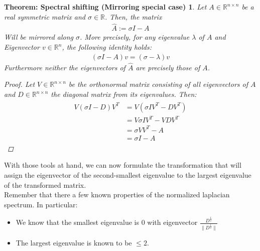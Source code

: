 \documentclass[10pt, a4paper, twocolumn]{article} %
\begin{document}
    \newtheorem{shifting}[]{Theorem: Spectral shifting (Mirroring special case)}[section]
    \begin{shifting}
        Let $A \in \mathbb{R}^{n \times n}$ be a real symmetric matrix and $\sigma \in \mathbb{R}$.
        Then, the matrix
        \begin{align}
            \hat{A} := \sigma I - A
        \end{align}
        Will be mirrored along $\sigma$. More precisely, for any eigenvalue $\lambda$ of $A$ and Eigenvector
        $v \in \mathbb{R}^n$, the following identity holds:
        \begin{align}
            \left( \sigma I -A \right) v = \left( \sigma - \lambda \right) v
        \end{align}
        Furthermore neither the eigenvectors of $\hat{A}$ are precisely those of $A$.
        \begin{proof}[Proof]
            Let $V \in \mathbb{R}^{n \times n}$ be the orthonormal matrix consisting of all eigenvectors of $A$
            and $D \in \mathbb{R}^{n \times n}$ the diagonal matrix from its eigenvalues. Then:
            \begin{align}
                \begin{split}
                    V \left( \sigma I - D \right) V^T & = V \left( \sigma I V^T - D V ^T \right) \\
                    & = V \sigma I V^T - VDV^T \\
                    & = \sigma V V^T - A \\
                    & = \sigma I -A
                \end{split}
            \end{align}
        \end{proof}
    \end{shifting}

    With those tools at hand, we can now formulate the transformation that will assign the eigenvector of the
    second-smallest eigenvalue to the largest eigenvalue of the transformed matrix.
    \\
    Remember that there a few known properties of the normalized laplacian spectrum. In particular:
    \begin{itemize}
        \item We know that the smallest eigenvalue is $0$ with eigenvector $\frac{D^\frac{1}{2}}{\lVert D^\frac{1}{2} \rVert}$ %
        \item The largest eigenvalue is known to be $ \leq 2$.
    \end{itemize}
\end{document}
